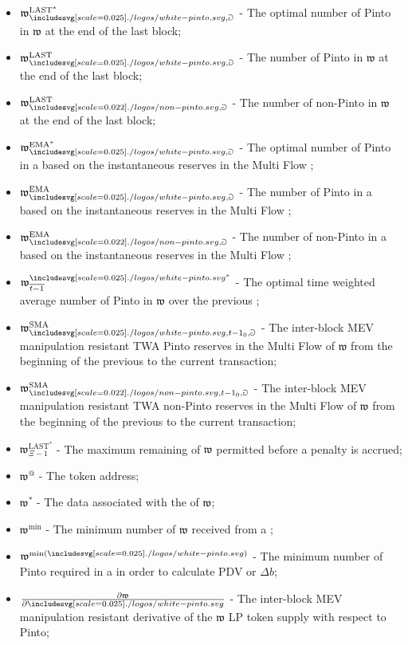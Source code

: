 \documentclass[class=article, crop=false]{standalone}
\begin{document}
\begin{itemize}[topsep=0pt, itemsep=3pt,leftmargin=16pt]
    \item[] $\mathfrak{w}_{\pinto,\Game}^{\text{LAST}^{*}}$ - The optimal number of Pinto in $\mathfrak{w}$ at the end of the last block;
    \item[] $\mathfrak{w}_{\pinto,\Game}^{\text{LAST}}$ - The number of Pinto in $\mathfrak{w}$ at the end of the last block;
    \item[] $\mathfrak{w}_{\nonpinto,\Game}^{\text{LAST}}$ - The number of non-Pinto in $\mathfrak{w}$ at the end of the last block;
    \item[] $\mathfrak{w}_{\pinto,\Game}^{\text{EMA}^{*}}$ - The optimal number of Pinto in a  based on the instantaneous reserves in the Multi Flow ;
    \item[] $\mathfrak{w}_{\pinto,\Game}^{\text{EMA}}$ - The number of Pinto in a  based on the instantaneous reserves in the Multi Flow ;
    \item[] $\mathfrak{w}_{\nonpinto,\Game}^{\text{EMA}}$ - The number of non-Pinto in a  based on the instantaneous reserves in the Multi Flow ;
    \item[] $\mathfrak{w}_{\overline{t-1}}^{{\pinto}^{*}}$ - The optimal time weighted average number of Pinto in $\mathfrak{w}$ over the previous ;
    \item[] $\mathfrak{w}_{\pinto,{t-1}_0,\Game}^{\text{SMA}}$ - The inter-block MEV manipulation resistant TWA Pinto reserves in the Multi Flow  of $\mathfrak{w}$ from the beginning of the previous  to the current transaction;
    \item[] $\mathfrak{w}_{\nonpinto,{t-1}_0,\Game}^{\text{SMA}}$ - The inter-block MEV manipulation resistant TWA non-Pinto reserves in the Multi Flow  of $\mathfrak{w}$ from the beginning of the previous  to the current transaction;
    \item[] $\mathfrak{w}_{\Xi-1}^{\text{LAST}^{*}}$ - The maximum remaining  of $\mathfrak{w}$ permitted before a penalty is accrued;
    \item[] $\mathfrak{w}^{@}$ - The  token address;
    \item[] $\mathfrak{w}^{*}$ - The data associated with the  of $\mathfrak{w}$;
    \item[] $\mathfrak{w}^{\text{min}}$ - The minimum number of $\mathfrak{w}$ received from a ;
    \item[] $\mathfrak{w}^{\text{min}(\pinto)}$ - The minimum number of Pinto required in a  in order to calculate PDV or $\Delta b$;
    \item[] $\frac{\partial \mathfrak{w}}{\partial \pinto}$ - The inter-block MEV manipulation resistant derivative of the $\mathfrak{w}$ LP token supply with respect to Pinto;
\end{itemize}
\end{document}
